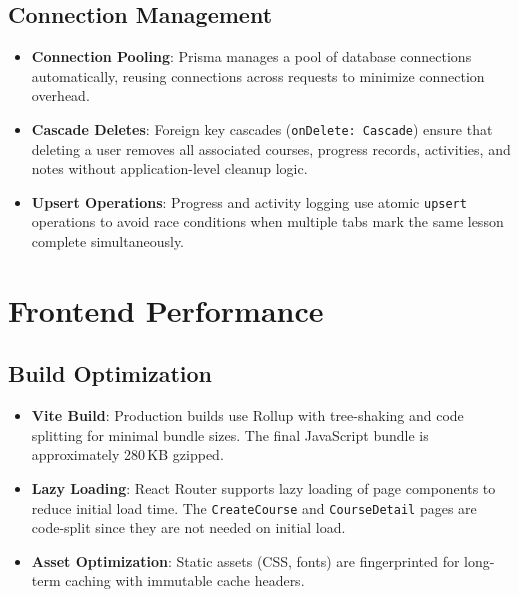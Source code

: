 \documentclass[12pt,a4paper]{report}
\begin{document}
\subsection{Connection Management}
\begin{itemize}[noitemsep]
    \item \textbf{Connection Pooling}: Prisma manages a pool of database connections automatically, reusing connections across requests to minimize connection overhead.
    \item \textbf{Cascade Deletes}: Foreign key cascades (\texttt{onDelete: Cascade}) ensure that deleting a user removes all associated courses, progress records, activities, and notes without application-level cleanup logic.
    \item \textbf{Upsert Operations}: Progress and activity logging use atomic \texttt{upsert} operations to avoid race conditions when multiple tabs mark the same lesson complete simultaneously.
\end{itemize}

\section{Frontend Performance}
\subsection{Build Optimization}
\begin{itemize}[noitemsep]
    \item \textbf{Vite Build}: Production builds use Rollup with tree-shaking and code splitting for minimal bundle sizes. The final JavaScript bundle is approximately 280\,KB gzipped.
    \item \textbf{Lazy Loading}: React Router supports lazy loading of page components to reduce initial load time. The \texttt{CreateCourse} and \texttt{CourseDetail} pages are code-split since they are not needed on initial load.
    \item \textbf{Asset Optimization}: Static assets (CSS, fonts) are fingerprinted for long-term caching with immutable cache headers.
\end{itemize}
\end{document}
